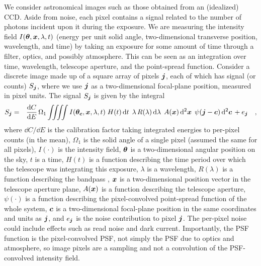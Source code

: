 We consider astronomical images such as those obtained from an
(idealized) CCD.  Aside from noise, each pixel contains a signal
related to the number of photons incident upon it during the exposure.
%
We are measuring the intensity field $I(\boldsymbol{\theta},\boldsymbol{x},\lambda,t)$
(energy per unit solid angle, two-dimensional transverse position,
wavelength, and time) by taking an exposure for some amount of time
through a filter, optics, and possibly atmosphere.  This can be seen
as an integration over time, wavelength, telescope aperture, and the
point-spread function.
%
Consider a discrete image made up of a square array of pixels $\boldsymbol{j}$,
each of which has signal (or counts) $S_{\boldsymbol{j}}$, where we use $\boldsymbol{j}$
as a two-dimensional focal-plane position, measured in pixel units.
The signal $S_{\boldsymbol{j}}$ is given by the integral
\begin{eqnarray}\displaystyle
S_{\jvec} &=& \frac{\dd C}{\dd E}\,\Omega_1\, %
\!
\int \!\!\!
\int \!\!\!
\int \!\!\!
\int
I(\thetavec_{\cvec},\posvec,\lambda,t)
\;H(t)\,
\dd t\,
\;
\lambda\,R(\lambda)\,
\dd\lambda\,
\;
A(\posvec)\,
\dd^2\posvec\,
\;
\psi(\jvec - \cvec)\,
\dd^2\cvec\,
 + \noise_{\jvec}
\quad,
\label{eqn:bigint}
\end{eqnarray}
where 
%
$\dd C/\dd E$ is the calibration factor taking integrated energies to per-pixel counts (in the mean),
%
$\Omega_1$ is the solid angle of a single pixel (assumed the same for all pixels),
%
$I(\cdot)$ is the intensity field,
%
$\boldsymbol{\theta}$ is a two-dimensional angular position on the sky,
%
$t$ is a time, $H(t)$ is a function describing the time period over which the telescope was
integrating this exposure,
%
$\lambda$ is a wavelength, $R(\lambda)$ is a function describing the bandpass \citep{kcorrect},
%
$\boldsymbol{x}$ is a two-dimensional position vector in the telescope aperture plane,
%
$A(\boldsymbol{x})$ is a function describing the telescope aperture,
%
$\psi(\cdot)$ is a function describing the pixel-convolved point-spread function of the
whole system,
%
$\boldsymbol{c}$ is a two-dimensional focal-plane position in the same coordinates and units as $\boldsymbol{j}$,
%
and
$e_{\boldsymbol{j}}$ is the noise contribution to pixel $\boldsymbol{j}$.
%
The per-pixel noise could include effects such as read noise and dark current.
%
Importantly, the PSF function is the pixel-convolved PSF, not simply
the PSF due to optics and atmosphere, so image pixels are a sampling
and not a convolution of the PSF-convolved intensity field.

